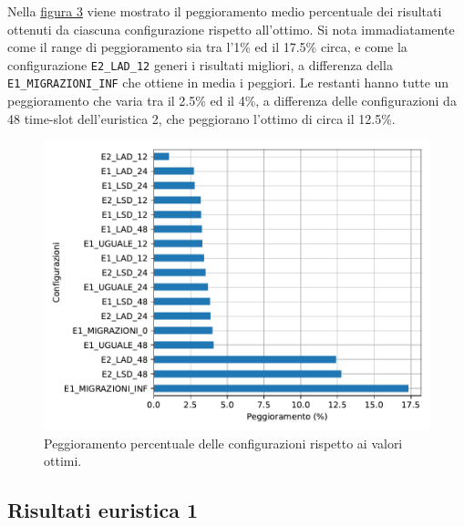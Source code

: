 Nella \hyperref[graf:peggioramento-perc]{figura 3} viene mostrato il peggioramento medio percentuale dei risultati ottenuti da ciascuna configurazione rispetto all'ottimo. Si nota immadiatamente come il range di peggioramento sia tra l'1\% ed il 17.5\% circa, e come la configurazione \texttt{E2\_LAD\_12} generi i risultati migliori, a differenza della \texttt{E1\_MIGRAZIONI\_INF} che ottiene in media i peggiori. Le restanti hanno tutte un peggioramento che varia tra il 2.5\% ed il 4\%, a differenza delle configurazioni da 48 time-slot dell'euristica 2, che peggiorano l'ottimo di circa il 12.5\%.

\begin{figure}[H]
    \centering
    \includegraphics[scale=0.75]{img/grafico-peggioramento-percentuale.pdf}
    \caption{Peggioramento percentuale delle configurazioni rispetto ai valori ottimi.}
    \label{graf:peggioramento-perc}
\end{figure}

%
%
\subsection{Risultati euristica 1}

